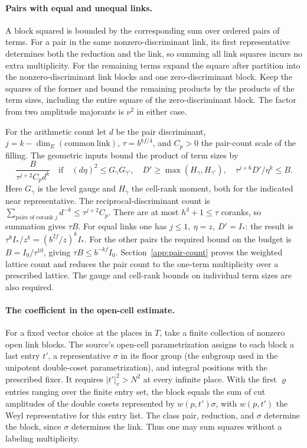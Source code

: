 \paragraph{Pairs with equal and unequal links.}\label{B:pairs}
A block squared is bounded by the corresponding sum over ordered
pairs of terms. For a pair in the same nonzero-discriminant link,
its first representative determines both the reduction and the
link, so summing all link squares incurs no extra multiplicity.
For the remaining terms expand the square after partition into the
nonzero-discriminant link blocks and one zero-discriminant block.
Keep the squares of the former and bound the remaining products by
the products of the term sizes, including the entire square of the
zero-discriminant block. The factor from two amplitude majorants
is \(\nu^2\) in either case.

For the arithmetic count let \(d\) be the pair discriminant,
\(j=k-\dim_E(\mathrm{common\ link})\), \(\tau=b^{kf/4}\), and
\(C_p>0\) the pair-count scale of the filling. The geometric
inputs bound the product of term sizes by
\[
 \frac{B}{\tau^{j+2}C_p d^k}
 \quad\text{if}\quad
 (d\eta)^2\le G_\gamma G_{\gamma'},\quad
 D'\ge\max(H_\gamma,H_{\gamma'}),\quad
 \tau^{j+6}D'/\eta^k\le B .
\]
Here \(G_\gamma\) is the level gauge and \(H_\gamma\) the cell-rank
moment, both for the indicated near representative. The
reciprocal-discriminant count is
\(\sum_{\text{pairs of corank }j}d^{-k}\le\tau^{j+2}C_p\).
There are at most \(h^3+1\le\tau\) coranks, so summation gives
\(\tau B\). For equal links one has \(j\le1,\ \eta=z,\ D'=I_*\):
the result is \(\tau^8 I_*/z^k=(b^{2f}/z)^k I_*\).
For the other pairs the required bound on the budget is
\(B=I_0/\tau^{10}\), giving \(\tau B\le b^{-kf}I_0\).
Section~\ref{app:pair-count} proves the weighted lattice count and reduces the
pair count to the one-term multiplicity over a prescribed lattice.
The gauge and cell-rank bounds on individual term sizes are also required.

\paragraph{The coefficient in the open-cell estimate.}
\label{B:openenergy}
For a fixed vector choice at the places in \(T\), take a finite
collection of nonzero open link blocks. The source's open-cell
parametrization assigns to each block a last entry \(t'\), a
representative \(\sigma\) in its floor group (the subgroup used in
the unipotent double-coset parametrization), and integral positions
with the prescribed fixer. It requires
\(|t'|_v^2>N^2\) at every infinite place. With the first
\(\varrho\) entries ranging over the finite entry set, the block
equals the sum of cut amplitudes of the double cosets represented
by \(w(p,t')\sigma\), with \(w(p,t')\) the Weyl representative
for this entry list. The class pair, reduction, and \(\sigma\)
determine the block, since \(\sigma\) determines the link. Thus one
may sum squares without a labeling multiplicity.

